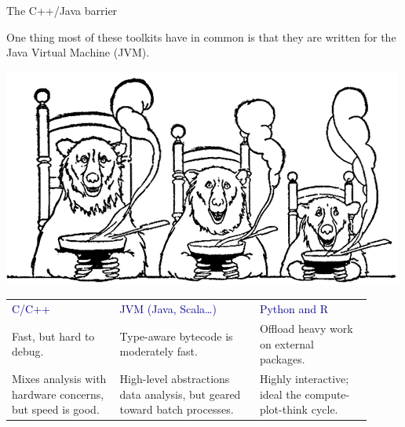\documentclass{beamer}
\begin{document}
\begin{frame}{The C++/Java barrier}

One thing most of these toolkits have in common is that they are written for the Java Virtual Machine (JVM).

\begin{center}
\includegraphics[width=0.5\linewidth]{three_bears.png}
\end{center}

\renewcommand{\arraystretch}{1.0} \begin{tabular}{>{\raggedright}p{0.27\linewidth} >{\raggedright}p{0.35\linewidth} >{\raggedright\arraybackslash}p{0.29\linewidth}}
\textcolor{darkblue}{C/C++} & \textcolor{darkblue}{JVM (Java, Scala\ldots)} & \textcolor{darkblue}{Python and R} \\
\vspace{-0.2 cm} Fast, but hard to debug. & \vspace{-0.2 cm} Type-aware bytecode is moderately fast. & \vspace{-0.2 cm} Offload heavy work on external packages. \\
Mixes analysis with hardware concerns, but speed is good. & High-level abstractions data analysis, but geared toward batch processes. & Highly interactive; ideal the compute- plot-think cycle.
\end{tabular}
\end{frame}









\end{document}
